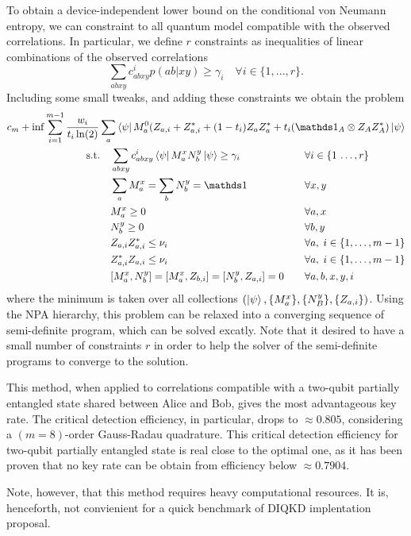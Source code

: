 To obtain a device-independent lower bound on the conditional von Neumann entropy, we can constraint  to  all quantum model compatible with the observed correlations. 
In particular, we define $r$ constraints as inequalities of linear combinations of the observed correlations 
\begin{equation}
	\sum_{abxy}c^i_{abxy}p(ab|xy) \geq \gamma_i \quad \forall i\in\{1,...,r\}.
\end{equation}
Including some small tweaks, and adding these constraints we obtain the problem 
\begin{equation}
	\begin{aligned}
		c_m + \inf \sum_{i=1}^{m-1}\frac{w_i}{t_i\ln(2)}\sum_a 	\bra{\psi} M_a^0(Z_{a,i}+ Z_{a,i}^* +(1-t_i)Z_aZ_a^*+t_i(\id_A\otimes Z_A Z_A^*)\ket{\psi} \\
	\begin{alignedat}{3}
			  &\text{s.t.}\quad && \sum_{abxy} c^i_{abxy}\bra{\psi} M_a^x N_b^y \ket{\psi} \geq \gamma_i  &&\forall i\in\{1\,\dots,r\} \\
			  & && \sum_a M_a^x = \sum_b N_b^y = \id &&\forall x,y\\
			  & && M_a^x \geq 0 && \forall a,x\\
			  & && N_b^y \geq 0 && \forall b,y\\
			  & && Z_{a,i}Z_{a,i}^* \leq \nu_i &&\forall a, \; i\in\{1,\dots,m-1\} \\
			  & && Z_{a,i}^*Z_{a,i} \leq \nu_i &&\forall a, \; i\in\{1,\dots,m-1\} \\
			  & && [M_a^x,N_b^y]=[M_a^x,Z_{b,i}]=[N_b^y,Z_{a,i}] = 0 \qquad&&\forall a,b,x,y,i
	\end{alignedat}
	\end{aligned}
\end{equation}
where the minimum is taken over all collections $(\ket{\psi},\{M_a^x\},\{N_B^y\},\{Z_{a,i}\})$.
Using the NPA hierarchy, this problem can be relaxed into a converging sequence of semi-definite program, which can be solved excatly.
Note that it desired to have a small number of constraints $r$ in order to help the solver of the semi-definite programs to converge to the solution.

\medbreak

This method, when applied to correlations compatible with a two-qubit partially entangled state shared between Alice and Bob, gives the most advantageous key rate. 
The critical detection efficiency, in particular, drops to $\approx 0.805$, considering a $(m=8)$-order Gauss-Radau quadrature.
This critical detection efficiency for two-qubit partially entangled state is real close to the optimal one, as it has been proven that no key rate can be obtain from efficiency below $\approx 0.7904$\cite{Lukanowski2022}.

Note, however, that this method requires heavy computational resources.
It is, henceforth, not convienient for a quick benchmark of DIQKD implentation proposal.
